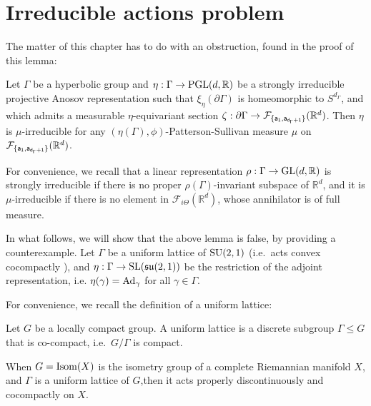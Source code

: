 \documentclass{report}
\begin{document}
\chapter{Irreducible actions problem}
The matter of this chapter has to do with an obstruction, found in the proof of this lemma: 
\begin{lemma}
Let $\Gamma$ be a hyperbolic group and $\eta:\Gamma \to \operatorname{{\mathrm{PGL}}}(d, \mathbb R)$ be a strongly irreducible projective Anosov representation such that $\xi_\eta(\partial \Gamma)$ is homeomorphic to $S^{d_\Gamma}$, and which admits a measurable $\eta$-equivariant section
$\zeta: \partial \Gamma \to \mathcal F_{\{ \sf a_1, \sf a_{d_\Gamma + 1}\}} (\mathbb R^d)$.
Then $\eta$ is $\mu$-irreducible for any $(\eta(\Gamma), \phi)$-Patterson-Sullivan measure $\mu$ on $\mathcal F_{\{ \sf a_1, \sf a_{d_\Gamma + 1}\}} (\mathbb R^d)$.
\end{lemma}

For convenience, we recall that a linear representation $\rho: \Gamma \to \operatorname{{\mathrm{GL}}}(d, \mathbb R)$ is strongly irreducible if there is no proper $\rho(\Gamma)$-invariant subspace of $\mathbb R^d$,
and it is $\mu$-irreducible if there is no element in $\mathcal F_{i \Theta}(\mathbb R^d)$, whose annihilator is of full measure.

In what follows, we will show that the above lemma is false, by providing a counterexample.
Let $\Gamma$ be a uniform lattice of $\operatorname{{\mathrm{SU}}}(2,1)$ (i.e.\ acts convex cocompactly ), and $\eta: \Gamma \to \operatorname{{\mathrm{SL}}}(\mathfrak{su}(2,1))$ be the restriction of the adjoint representation, i.e. $\eta(\gamma) = \operatorname{Ad}_{\gamma}$ for all $\gamma \in \Gamma$.

For convenience, we recall the definition of a uniform lattice:
\begin{definition}
    Let $G$ be a locally compact group.
    A uniform lattice is a discrete subgroup $\Gamma \leq G$ that is co-compact, i.e.\ $G/\Gamma$ is compact.  
\end{definition}
\begin{remark}
    When $G = \operatorname{Isom}(X)$ is the isometry group of a complete Riemannian manifold $X$, and $\Gamma$ is a uniform lattice of $G$,then it acts properly discontinuously and cocompactly on $X$.
\end{remark}
\end{document}

